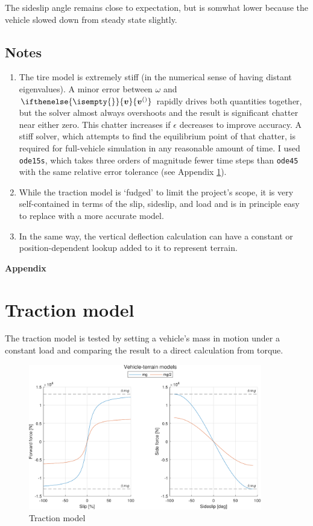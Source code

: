 \documentclass[9pt]{extarticle}
\renewcommand{\vec}[2][]{\ifthenelse{\isempty{#1}}{\boldsymbol{#2}}{\boldsymbol{#2}^{(#1)}} }
\begin{document}
\begin{multicols*}{2}
The sideslip angle remains close to expectation, but is somwhat lower because
the vehicle slowed down from steady state slightly. 

\subsection{Notes}
\begin{enumerate}
	\item The tire model is extremely stiff (in the numerical sense of having
		distant eigenvalues). A minor error between \(\omega\) and \(\vec{v}\)
		rapidly drives both quantities together, but the solver almost always
		overshoots and the result is significant chatter near either zero. This
		chatter increases if \(\epsilon\) decreases to improve accuracy. A stiff
		solver, which attempts to find the equilibrium point of that chatter, is
		required for full-vehicle simulation in any reasonable amount of time. I
		used \verb|ode15s|, which takes three orders of magnitude fewer time
		steps than \verb|ode45| with the same relative error tolerance (see
		Appendix \ref{stiffcompare}).

	\item While the traction model is `fudged' to limit the project's scope, it
		is very self-contained in terms of the slip, sideslip, and load and is
		in principle easy to replace with a more accurate model.

	\item In the same way, the vertical deflection calculation can have a
		constant or position-dependent lookup added to it to represent terrain.
\end{enumerate}


\end{multicols*}

\pagebreak
\appendix
\begin{center}
	\Large \bf Appendix
\end{center}
\section{Traction model} \label{stiffcompare}
The traction model is tested by setting a vehicle's mass in motion under a
constant load and comparing the result to a direct calculation from torque. 

\begin{figure}[H]
	\centering
	\includegraphics[height=2.5in]{fig/traction.pdf}
	\caption{Traction model}
\end{figure}
\end{document}
